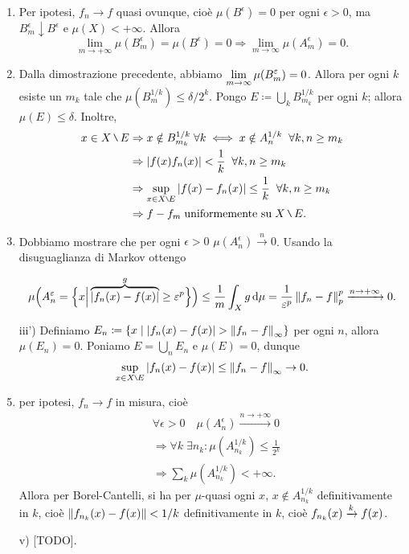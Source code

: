 \documentclass[a4paper, 12pt]{report}
\begin{document}
\begin{enumerate}
\item Per ipotesi, $f_n \to f$ quasi ovunque, cioè $\mu(B^\epsilon) = 0$ per ogni $\epsilon > 0$, ma $B_m^\epsilon \downarrow B^\epsilon$ e $\mu(X) < +\infty$.
Allora
%
$$
\lim_{m \to +\infty} \mu(B_m^\epsilon) = \mu(B^\epsilon) = 0 \Rightarrow \lim_{m \to \infty} \mu(A_m^\epsilon) = 0.
$$
%

\item Dalla dimostrazione precedente, abbiamo $\displaystyle \lim_{m \to \infty} \mu(B_m^\varepsilon) = 0$. 
Allora per ogni $k$ esiste un $m_k$ tale che $\mu \left( B_m^{1/k} \right) \leq \delta / 2^k$.
Pongo $E \coloneqq  \bigcup_{k} B_{m_k}^{1/k}$ per ogni $k$; allora $\mu(E) \leq \delta$.
Inoltre,
\begin{align*}
x \in X \setminus E & \Rightarrow x \notin B_{m_k}^{1/k} \; \forall k \iff x \notin A_n^{1/k} \mquad \forall k,n \geq m_ k \\
& \Rightarrow \left| f(x) f_n(x) \right| < \frac{1}{k} \mquad \forall k,n \geq m_k \\
& \Rightarrow \sup_{x \in X \setminus E} \left| f(x) - f_n(x) \right| \leq \frac{1}{k} \mquad \forall k,n \geq m_k \\
& \Rightarrow f - f_m \; \text{uniformemente su} \; X \setminus E.
\end{align*}

\item Dobbiamo mostrare che per ogni $\epsilon > 0$ $\mu(A_n^\epsilon) \xrightarrow{n} 0$.
Usando la disuguaglianza di Markov ottengo

%
$$
\mu \Big( A_n^\varepsilon= \Big\{ x \Big| \overbrace{\left| f_n(x) - f(x) \right|}^{g} \geq \varepsilon^p \Big\} \Big)
\leq \frac{1}{m} \int_{X}^{} g \,\mathrm{d} \mu = \frac{1}{\varepsilon^p} \left\lVert f_n - f \right\rVert_p^p \xrightarrow{n \to +\infty} 0.
$$
%

\item[iii')] Definiamo $\displaystyle E_n \coloneqq  \left\{ x \;\middle|\; \left| f_n(x) - f(x) \right| > \left\lVert f_n - f \right\rVert_\infty \right\}$ per ogni $n$, allora $\mu(E_n) = 0$.
Poniamo $E = \bigcup_{n} E_n$ e $\mu(E) = 0$, dunque
%
$$
\sup_{x \in X\setminus E} \left| f_n(x) - f(x) \right| \leq \norm{f_n - f}_\infty \to 0.
$$
%


\item per ipotesi, $f_n \to f$ in misura, cioè
\begin{align*}
& \forall \epsilon > 0 \quad \mu \left( A_n^\epsilon \right) \xrightarrow{n \to +\infty} 0 \\
& \Rightarrow \forall k \; \exists n_k \colon \mu \left( A_{n_k}^{1/k} \right) \leq \frac{1}{2^k} \\
& \Rightarrow \sum_{k}^{} \mu \left( A_{n_k}^{1/k} \right) < +\infty. 
\end{align*}
Allora per Borel-Cantelli, si ha per $\mu$-quasi ogni $x$, $x \notin A_{n_k}^{1/k}$ definitivamente in $k$, cioè $\left\lVert f_{n_k}(x) - f(x) \right\rVert < 1/k$ definitivamente in $k$, cioè $\displaystyle f_{n_k}(x) \xrightarrow{k} f(x)$.

\item[v)] [TODO].

\end{enumerate}
\end{document}
